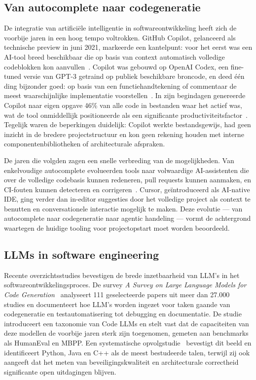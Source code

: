 \subsection{Van autocomplete naar codegeneratie}
\label{subsec:autocomplete-codegeneratie}

De integratie van artificiële intelligentie in softwareontwikkeling heeft zich de voorbije jaren in een hoog tempo voltrokken. GitHub Copilot, gelanceerd als technische preview in juni 2021, markeerde een kantelpunt: voor het eerst was een AI-tool breed beschikbaar die op basis van context automatisch volledige codeblokken kon aanvullen~\autocite{WikipediaCopilot2021}. Copilot was gebouwd op OpenAI Codex, een fine-tuned versie van GPT-3 getraind op publiek beschikbare broncode, en deed één ding bijzonder goed: op basis van een functiehandtekening of commentaar de meest waarschijnlijke implementatie voorstellen~\autocite{RemoteVibe2026}. In zijn begindagen genereerde Copilot naar eigen opgave 46\% van alle code in bestanden waar het actief was, wat de tool onmiddellijk positioneerde als een significante productiviteitsfactor~\autocite{RemoteVibe2026}. Tegelijk waren de beperkingen duidelijk: Copilot werkte bestandsgewijs, had geen inzicht in de bredere projectstructuur en kon geen rekening houden met interne componentenbibliotheken of architecturale afspraken.

De jaren die volgden zagen een snelle verbreding van de mogelijkheden. Van enkelvoudige autocomplete evolueerden tools naar volwaardige AI-assistenten die over de volledige codebasis kunnen redeneren, pull requests kunnen aanmaken, en CI-fouten kunnen detecteren en corrigeren~\autocite{RemoteVibe2026}. Cursor, geïntroduceerd als AI-native IDE, ging verder dan in-editor suggesties door het volledige project als context te benutten en conversationele interactie mogelijk te maken. Deze evolutie --- van autocomplete naar codegeneratie naar agentic handeling --- vormt de achtergrond waartegen de huidige tooling voor projectopstart moet worden beoordeeld.

\subsection{LLMs in software engineering}
\label{subsec:llms-software-engineering}

Recente overzichtsstudies bevestigen de brede inzetbaarheid van LLM's in het softwareontwikkelingsproces. De survey \textit{A Survey on Large Language Models for Code Generation}~\autocite{Jiang2024} analyseert 111 geselecteerde papers uit meer dan 27.000 studies en documenteert hoe LLM's worden ingezet voor taken gaande van codegeneratie en testautomatisering tot debugging en documentatie. De studie introduceert een taxonomie van Code LLMs en stelt vast dat de capaciteiten van deze modellen de voorbije jaren sterk zijn toegenomen, gemeten aan benchmarks als HumanEval en MBPP. Een systematische opvolgstudie~\autocite{KoyaUniversity2025} bevestigt dit beeld en identificeert Python, Java en C++ als de meest bestudeerde talen, terwijl zij ook aangeeft dat het meten van beveiligingskwaliteit en architecturale correctheid significante open uitdagingen blijven.


